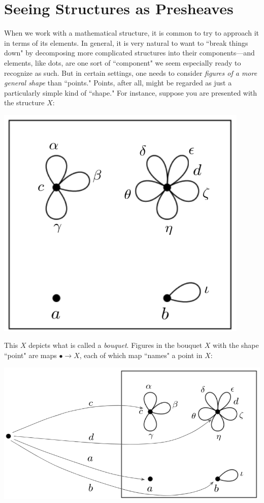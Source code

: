 \documentclass[a4paper]{book}
\theoremstyle{definition}
\theoremstyle{definition}
\theoremstyle{definition}
\theoremstyle{theorem}
\theoremstyle{definition}
\begin{document}
\section{Seeing Structures as Presheaves}
When we work with a mathematical structure, it is common to try to approach it in terms of its elements. In general, it is very natural to want to ``break things down" by decomposing more complicated structures into their components---and elements, like dots, are one sort of ``component" we seem especially ready to recognize as such. But in certain settings, one needs to consider \textit{figures of a more general shape} than ``points." Points, after all, might be regarded as just a particularly simple kind of ``shape." For instance, suppose you are presented with the structure $X$: 
\begin{center}
	\includegraphics*[scale=0.25]{Bouquet2.png}
\end{center}
This $X$ depicts what is called a \textit{bouquet}. Figures in the bouquet $X$ with the shape ``point" are maps $\bullet \rightarrow X$, each of which map ``names" a point in $X$: 
\begin{center}
	\includegraphics*[scale=0.25]{BouquetPoints.png}
\end{center}
\end{document}
